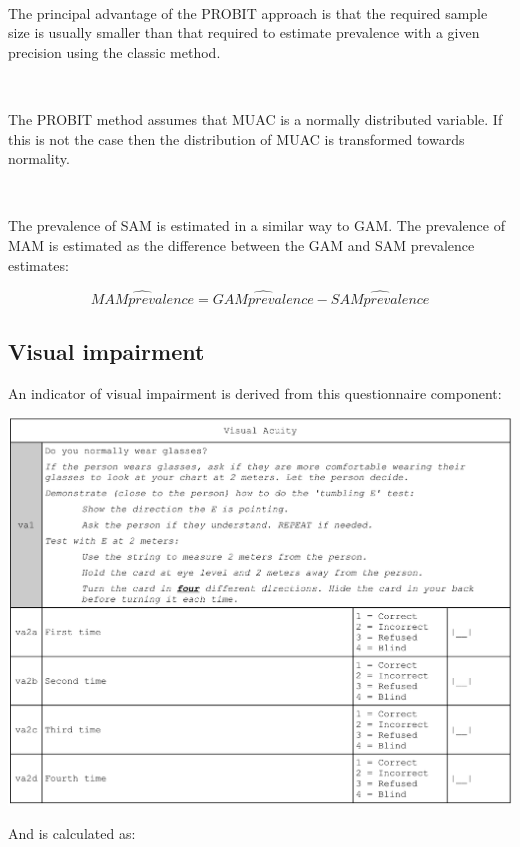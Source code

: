 \documentclass[12pt,a4paper]{book}
\theoremstyle{definition}
\theoremstyle{definition}
\theoremstyle{definition}
\theoremstyle{remark}
\begin{document}
~

The principal advantage of the PROBIT approach is that the required
sample size is usually smaller than that required to estimate prevalence
with a given precision using the classic method.

~

The PROBIT method assumes that MUAC is a normally distributed variable.
If this is not the case then the distribution of MUAC is transformed
towards normality.

~

The prevalence of SAM is estimated in a similar way to GAM. The
prevalence of MAM is estimated as the difference between the GAM and SAM
prevalence estimates:

\[\widehat{MAM prevalence} = \widehat{GAM prevalence} - \widehat{SAM prevalence}\]

\newpage

\hypertarget{visual-impairment}{%
\subsection{Visual impairment}\label{visual-impairment}}

An indicator of visual impairment is derived from this questionnaire
component:

\begin{center}\includegraphics{figures/questionnaire12} \end{center}

\newpage

And is calculated as:
\end{document}

